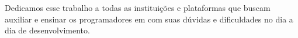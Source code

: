 Dedicamos esse trabalho a todas as instituições e plataformas que buscam auxiliar e ensinar os programadores em com suas dúvidas e dificuldades no dia a dia de desenvolvimento.